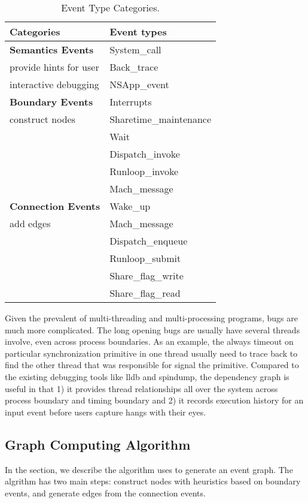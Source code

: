 \begin{table}[ht]
  \centering
  \begin{tabularx}{\columnwidth}{|X|X|}
  	\hline
    \textbf{Categories} & \textbf{Event types}\\
	\hline
	\hline
    {\bf Semantics Events} & System\_call\\
    provide hints for user & Back\_trace\\					   
	interactive debugging  & NSApp\_event\\
    \hline
    {\bf Boundary Events} & Interrupts\\
	construct nodes & Sharetime\_maintenance\\
	& Wait\\
	& Dispatch\_invoke\\
    & Runloop\_invoke\\
	& Mach\_message\\
    \hline
	{\bf Connection Events} & Wake\_up\\
    add edges & Mach\_message\\
    & Dispatch\_enqueue\\
    & Runloop\_submit\\
	& Share\_flag\_write\\
	& Share\_flag\_read\\
    \hline
  \end{tabularx}
  \caption{Event Type Categories. }
  \label{table:event_types}
\end{table}

Given the prevalent of multi-threading and multi-processing programs, bugs are
much more complicated. The long opening bugs are usually have several threads
involve, even across process boundaries. As an example, the always timeout on
particular synchronization primitive in one thread usually need to trace back to
find the other thread that was responsible for signal the primitive. Compared
to the existing debugging tools like lldb and spindump, the dependency graph is
useful in that 1) it provides thread relationships all over the system across
process boundary and timing boundary and 2) it records execution history for an
input event before users capture hangs with their eyes.

\subsection{Graph Computing Algorithm}

In the section, we describe the algorithm \xxx uses to generate an event graph.
The algrithm has two main steps: construct nodes with heuristics based on
boundary events, and generate edges from the connection events.

